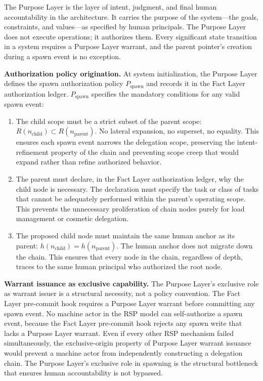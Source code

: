 The Purpose Layer is the layer of intent, judgment, and final human accountability in the \bxthree{} architecture. It carries the purpose of the system---the goals, constraints, and values---as specified by human principals. The Purpose Layer does not execute operations; it authorizes them. Every significant state transition in a \bxthree{} system requires a Purpose Layer warrant, and the parent pointer's creation during a spawn event is no exception.

\bigskip
\noindent\textbf{Authorization policy origination.} At system initialization, the Purpose Layer defines the spawn authorization policy $P_{\text{spawn}}$ and records it in the Fact Layer authorization ledger. $P_{\text{spawn}}$ specifies the mandatory conditions for any valid spawn event:

\begin{enumerate}
    \item[(S1) \textbf{Scope refinement}] The child scope must be a strict subset of the parent scope: $R(n_{\text{child}}) \subset R(n_{\text{parent}})$. No lateral expansion, no superset, no equality. This ensures each spawn event narrows the delegation scope, preserving the intent-refinement property of the chain and preventing scope creep that would expand rather than refine authorized behavior.

    \item[(S2) \textbf{Operational necessity}] The parent must declare, in the Fact Layer authorization ledger, why the child node is necessary. The declaration must specify the task or class of tasks that cannot be adequately performed within the parent's operating scope. This prevents the unnecessary proliferation of chain nodes purely for load management or cosmetic delegation.

    \item[(S3) \textbf{Human anchor continuity}] The proposed child node must maintain the same human anchor as its parent: $h(n_{\text{child}}) = h(n_{\text{parent}})$. The human anchor does not migrate down the chain. This ensures that every node in the chain, regardless of depth, traces to the same human principal who authorized the root node.
\end{enumerate}

\bigskip
\noindent\textbf{Warrant issuance as exclusive capability.} The Purpose Layer's exclusive role as warrant issuer is a structural necessity, not a policy convention. The Fact Layer pre-commit hook requires a Purpose Layer warrant before committing any spawn event. No machine actor in the RSP model can self-authorize a spawn event, because the Fact Layer pre-commit hook rejects any spawn write that lacks a Purpose Layer warrant. Even if every other RSP mechanism failed simultaneously, the exclusive-origin property of Purpose Layer warrant issuance would prevent a machine actor from independently constructing a delegation chain. The Purpose Layer's exclusive role in spawning is the structural bottleneck that ensures human accountability is not bypassed.

